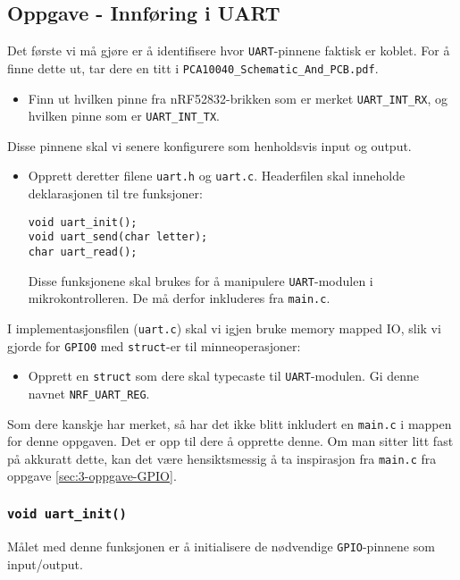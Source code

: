 \subsection{Oppgave - Innføring i UART}

Det første vi må gjøre er å identifisere hvor \verb|UART|-pinnene faktisk er koblet. For å finne dette ut, tar dere en titt i \verb|PCA10040_Schematic_And_PCB.pdf|. 

\begin{itemize}
    \item Finn ut hvilken pinne fra nRF52832-brikken som er merket \verb|UART_INT_RX|, og hvilken pinne som er \verb|UART_INT_TX|.
\end{itemize}

 Disse pinnene skal vi senere konfigurere som henholdsvis input og output.
 
 \begin{itemize}
     \item Opprett deretter filene \verb|uart.h| og \verb|uart.c|. Headerfilen skal inneholde deklarasjonen til tre funksjoner:

\begin{lstlisting}
void uart_init();
void uart_send(char letter);
char uart_read();
\end{lstlisting} 
Disse funksjonene skal brukes for å manipulere \verb|UART|-modulen i mikrokontrolleren. De må derfor inkluderes fra \verb|main.c|.
 \end{itemize}
 
 I implementasjonsfilen (\verb|uart.c|) skal vi igjen bruke memory mapped IO, slik vi gjorde for \verb|GPIO0| med \verb|struct|-er til minneoperasjoner:
 
 \begin{itemize}
    \item Opprett en \verb|struct| som dere skal typecaste til \verb|UART|-modulen. Gi denne navnet \verb|NRF_UART_REG|.
\end{itemize}

Som dere kanskje har merket, så har det ikke blitt inkludert en \verb|main.c| i mappen for denne oppgaven. Det er opp til dere å opprette denne. Om man sitter litt fast på akkuratt dette, kan det være hensiktsmessig å ta inspirasjon fra \verb|main.c| fra oppgave \ref{sec:3-oppgave-GPIO}.





\cprotect\subsubsection{\lstinline{void uart_init()}}
Målet med denne funksjonen er å initialisere de nødvendige \verb|GPIO|-pinnene som input/output. 


